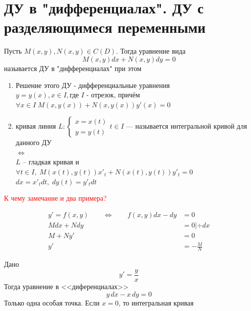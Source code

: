 \author{Andrei Tkachuk}

\section{ДУ в "дифференциалах". ДУ с разделяющимеся переменными}

\begin{Def}
    Пусть $M(x, y), N(x, y) \in C(D)$. Тогда уравнение вида
    \[
        M(x, y)dx + N(x, y)dy = 0
    \]
    называется ДУ в "дифференциалах" при этом
    \begin{enumerate}
        \item Решение этого ДУ - дифференциальные  уравнения $y = y(x), x \in I, \text{где } I \text{ - отрезок}$, причём\\
        $\forall x \in I \; M(x, y(x)) + N(x, y(x))y'(x) = 0$
        \item кривая линия $L : 
        \begin{cases}
            x = x(t)\\
            y = y(t)    
        \end{cases} t \in I$ --- называется интегральной кривой для данного ДУ\\
        $\Leftrightarrow$\\
        $L$ -- гладкая кривая и $\forall t \in I, \; M(x(t), y(t))x'_t + N(x(t), y(t))y'_t = 0$\\
        $dx = x'_tdt, \; dy(t) = y'_tdt$
    \end{enumerate}
\end{Def}

\textcolor{red}{К чему замечание и два примера?}

\begin{Note}
    \begin{align*}
        y' = f(x, y) \qquad \Leftrightarrow \qquad f(x, y)dx - dy &= 0\\
        Mdx + Ndy &= 0 | \div dx\\
        M + Ny' &= 0\\
        y' &= -\frac{M}{N}
    \end{align*}
\end{Note}

\begin{Example} 
    Дано
    \[
        y' = \frac{y}{x}
    \]
    Тогда уравнение в <<диференциалах>>
    \[
        y\,dx - x\,dy = 0
    \]
    Только одна особая точка. Если $x = 0$, то интегральная кривая
\end{Example}

